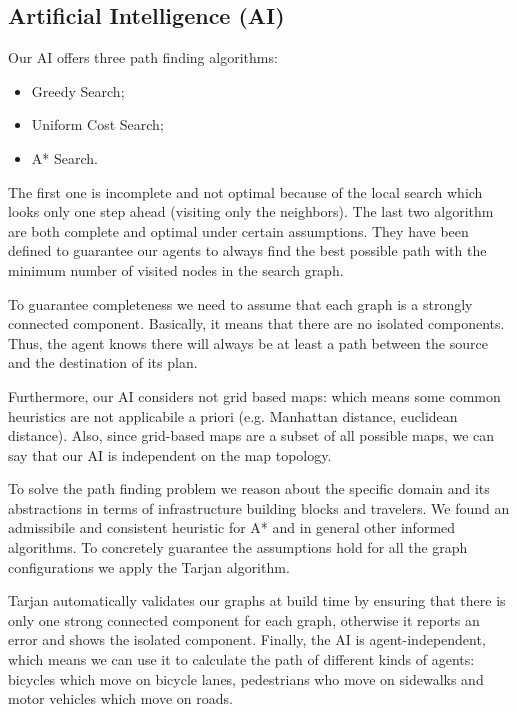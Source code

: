 \subsection{Artificial Intelligence (AI)}

Our AI offers three path finding algorithms:
\begin{itemize}
  \item Greedy Search;
  \item Uniform Cost Search;
  \item A* Search.
\end{itemize}

The first one is incomplete and not optimal because of the local search which looks only one step ahead (visiting
only the neighbors). The last two algorithm are both complete and optimal under certain assumptions. They have been defined
to guarantee our agents to always find the best possible path with the minimum number of visited nodes in the search graph.

To guarantee completeness we need to assume that each graph is a strongly
connected component. Basically, it means that there are no isolated
components. Thus, the agent knows there will always be at least a path between
the source and the destination of its plan. %

Furthermore, our AI considers not grid based maps: which means some common
heuristics are not applicabile a priori (e.g. Manhattan distance, euclidean
distance). Also, since grid-based maps are a subset of all possible maps, we
can say that our AI is independent on the map topology.

To solve the path finding problem we reason about the specific domain and its
abstractions in terms of infrastructure building blocks and travelers. We
found an admissibile and consistent heuristic for A* and in general other
informed algorithms. To concretely guarantee the assumptions hold for all the
graph configurations we apply the Tarjan algorithm.

Tarjan automatically validates our graphs at build time by ensuring that there
is only one strong connected component for each graph, otherwise it reports
an error and shows the isolated component.
Finally, the AI is agent-independent, which means we can use it to calculate
the path of different kinds of agents: bicycles which move on bicycle lanes,
pedestrians who move on sidewalks and motor vehicles which move on roads.
